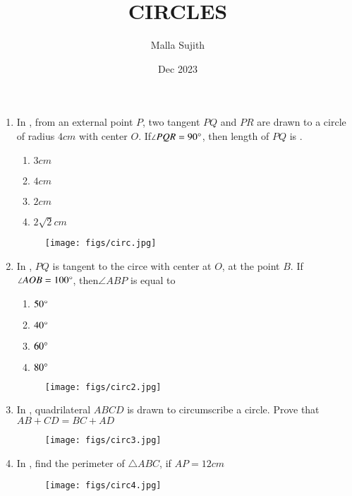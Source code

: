 \documentclass[12pt,-letter paper]{article}
\title{CIRCLES}
\author{Malla Sujith}
\date{Dec 2023}
\begin{document}
\maketitle
\begin{enumerate}
\item In , from an external point $P$, two tangent $PQ$ and $PR$ are drawn to a circle of radius $4cm$ with center $O$. If$\angle{PQR}=90\degree$, then length of $PQ$ is \underline {\hspace{4cm}}.
\begin{enumerate}[label=(\alph*)]
\item $3cm$ 
\item $4cm$
\item $2cm$
\item $2{\sqrt{2}}cm$ 
\end{enumerate}
\begin{figure}[H]
\centering
\texttt{[image: figs/circ.jpg]}
\caption{}
\label{fig:circ}
\end{figure}
\item In , $PQ$ is tangent to the circe with center at $O$, at the point $B$. If$\angle AOB=100\degree$, then$\angle ABP$ is equal to\newline
\begin{enumerate}[label=(\alph*)] 
\item $50\degree$ 
\item $40\degree$ 
\item $60\degree$ 
\item $80\degree$
\end{enumerate}
\begin{figure}[H]
\centering
\texttt{[image: figs/circ2.jpg]}
\caption{}
\label{fig:circ2}
\end{figure}
\item In , quadrilateral $ABCD$ is drawn to circumscribe a circle. Prove that\newline
$AB+CD=BC+AD$
\begin{figure}[H]
\centering
\texttt{[image: figs/circ3.jpg]}
\caption{}
\label{fig:circ3}
\end{figure}
\item In , find the perimeter of $\triangle ABC$, if $AP=12cm$
\begin{figure}[H]
\centering
\texttt{[image: figs/circ4.jpg]}
\caption{}  
\label{fig:circ4}
\end{figure}
\end{enumerate}
\end{document}
